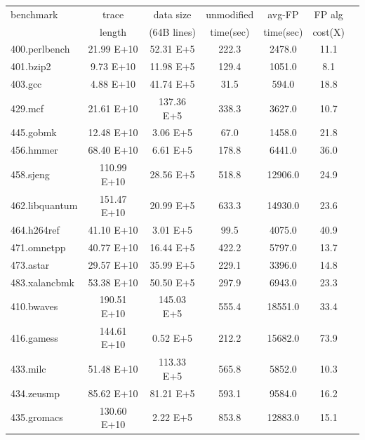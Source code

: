 \begin{table}[h]
\centering
\footnotesize
\begin{tabular}{|l|c|c|c|c|c|c|}
\hline
benchmark        &trace   &data size   &unmodified  &avg-FP &FP alg \\ 
&length &(64B lines) &time(sec) &time(sec) &cost(X)\\ \hline \hline
400.perlbench    & 21.99 E+10    & 52.31 E+5     & 222.3         & 2478.0        & 11.1 \\ \hline
401.bzip2        & 9.73 E+10     & 11.98 E+5     & 129.4         & 1051.0        & 8.1 \\ \hline
403.gcc          & 4.88 E+10     & 41.74 E+5     & 31.5          & 594.0         & 18.8 \\ \hline
429.mcf          & 21.61 E+10    & 137.36 E+5    & 338.3         & 3627.0        & 10.7 \\ \hline
445.gobmk        & 12.48 E+10    & 3.06 E+5      & 67.0          & 1458.0        & 21.8 \\ \hline
456.hmmer        & 68.40 E+10    & 6.61 E+5      & 178.8         & 6441.0        & 36.0 \\ \hline
458.sjeng        & 110.99 E+10   & 28.56 E+5     & 518.8         & 12906.0       & 24.9 \\ \hline
462.libquantum   & 151.47 E+10   & 20.99 E+5     & 633.3         & 14930.0       & 23.6 \\ \hline
464.h264ref      & 41.10 E+10    & 3.01 E+5      & 99.5          & 4075.0        & 40.9 \\ \hline
471.omnetpp      & 40.77 E+10    & 16.44 E+5     & 422.2         & 5797.0        & 13.7 \\ \hline
473.astar        & 29.57 E+10    & 35.99 E+5     & 229.1         & 3396.0        & 14.8 \\ \hline
483.xalancbmk    & 53.38 E+10    & 50.50 E+5     & 297.9         & 6943.0        & 23.3 \\ \hline
\hline
410.bwaves       & 190.51 E+10   & 145.03 E+5    & 555.4         & 18551.0       & 33.4 \\ \hline
416.gamess       & 144.61 E+10   & 0.52 E+5      & 212.2         & 15682.0       & 73.9 \\ \hline
433.milc         & 51.48 E+10    & 113.33 E+5    & 565.8         & 5852.0        & 10.3 \\ \hline
434.zeusmp       & 85.62 E+10    & 81.21 E+5     & 593.1         & 9584.0        & 16.2 \\ \hline
435.gromacs      & 130.60 E+10   & 2.22 E+5      & 853.8         & 12883.0       & 15.1 \\ \hline

\end{tabular}
\end{table}
